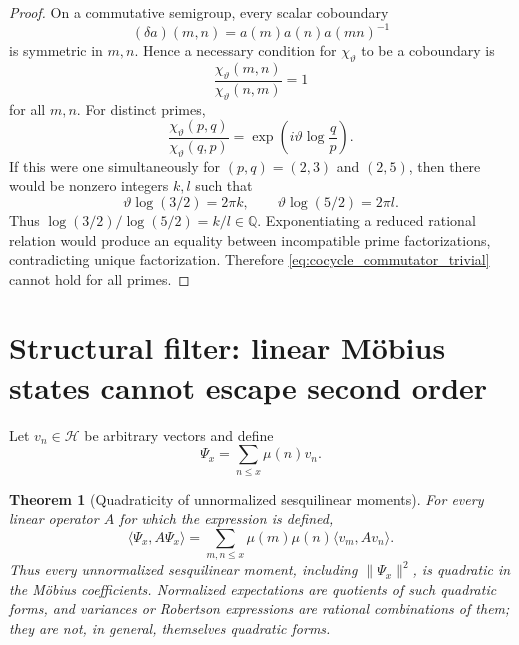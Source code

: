 \documentclass[11pt]{amsart}
\numberwithin{equation}{section}
\theoremstyle{plain}
\newtheorem{theorem}{Theorem}[section]
\theoremstyle{definition}
\theoremstyle{remark}
\newcommand{\Hil}{\mathcal{H}}
\begin{document}
\begin{proof}
On a commutative semigroup, every scalar coboundary
\begin{equation}
(\delta a)(m,n)=a(m)a(n)a(mn)^{-1}
\label{eq:scalar_coboundary}
\end{equation}
is symmetric in \(m,n\).  Hence a necessary condition for
\(\chi_\vartheta\) to be a coboundary is
\begin{equation}
\frac{\chi_\vartheta(m,n)}{\chi_\vartheta(n,m)}=1
\label{eq:cocycle_commutator_trivial}
\end{equation}
for all \(m,n\).  For distinct primes,
\begin{equation}
\frac{\chi_\vartheta(p,q)}{\chi_\vartheta(q,p)}
=
\exp\left(i\vartheta\log\frac{q}{p}\right).
\label{eq:prime_cocycle_commutator}
\end{equation}
If this were one simultaneously for \((p,q)=(2,3)\) and \((2,5)\), then
there would be nonzero integers \(k,l\) such that
\begin{equation}
\vartheta\log(3/2)=2\pi k,
\qquad
\vartheta\log(5/2)=2\pi l.
\label{eq:two_prime_phase_integrality}
\end{equation}
Thus \(\log(3/2)/\log(5/2)=k/l\in\mathbb Q\).  Exponentiating a
reduced rational relation would produce an equality between incompatible
prime factorizations, contradicting unique factorization.  Therefore
\eqref{eq:cocycle_commutator_trivial} cannot hold for all primes.
\end{proof}


\section{Structural filter: linear M\"obius states cannot escape second order}
\label{sec:linear_state_filter}

Let \(v_n\in\Hil\) be arbitrary vectors and define
\begin{equation}
\Psi_x=\sum_{n\le x}\mu(n)v_n.
\label{eq:linear_mobius_state}
\end{equation}

\begin{theorem}[Quadraticity of unnormalized sesquilinear moments]
\label{thm:linear_state_quadratic_obstruction}
For every linear operator \(A\) for which the expression is defined,
\begin{equation}
\langle\Psi_x,A\Psi_x\rangle
=\sum_{m,n\le x}\mu(m)\mu(n)\langle v_m,Av_n\rangle.
\label{eq:expectation_bilinear_mobius}
\end{equation}
Thus every unnormalized sesquilinear moment, including
\(\|\Psi_x\|^2\), is quadratic in the M\"obius coefficients.
Normalized expectations are quotients of such quadratic forms, and variances
or Robertson expressions are rational combinations of them; they are not,
in general, themselves quadratic forms.
\end{theorem}
\end{document}
